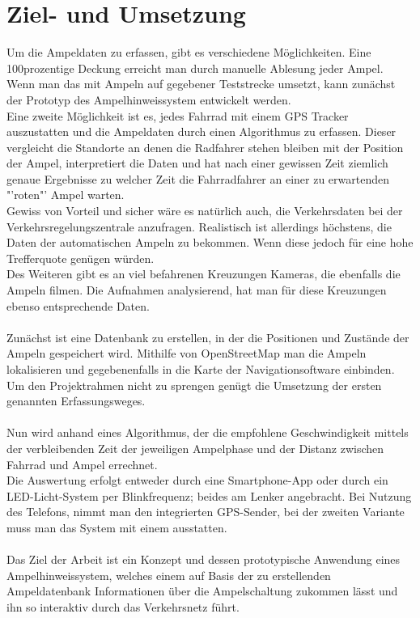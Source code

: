 \section{Ziel- und Umsetzung}
Um die Ampeldaten zu erfassen, gibt es verschiedene Möglichkeiten. Eine 100prozentige Deckung erreicht man durch manuelle Ablesung jeder Ampel. Wenn man das mit Ampeln auf gegebener Teststrecke umsetzt, kann zunächst der Prototyp des Ampelhinweissystem entwickelt werden. \\
Eine zweite Möglichkeit ist es, jedes Fahrrad mit einem \gls{GPS} Tracker auszustatten und die Ampeldaten durch einen Algorithmus zu erfassen. Dieser vergleicht die Standorte an denen die Radfahrer stehen bleiben mit der Position der Ampel, interpretiert die Daten und hat nach einer gewissen Zeit ziemlich genaue Ergebnisse zu welcher Zeit die Fahrradfahrer an einer zu erwartenden "'roten"' Ampel warten.\\
Gewiss von Vorteil und sicher wäre es natürlich auch, die Verkehrsdaten bei der Verkehrsregelungszentrale anzufragen. Realistisch ist allerdings höchstens, die Daten der automatischen Ampeln zu bekommen. Wenn diese jedoch für eine hohe Trefferquote genügen würden.\\
Des Weiteren gibt es an viel befahrenen Kreuzungen Kameras, die ebenfalls die Ampeln filmen. Die Aufnahmen analysierend, hat man für diese Kreuzungen ebenso entsprechende Daten.\\\\
Zunächst ist eine Datenbank zu erstellen, in der die Positionen und Zustände der Ampeln gespeichert wird. Mithilfe von OpenStreetMap man die Ampeln lokalisieren und gegebenenfalls in die Karte der Navigationsoftware einbinden. Um den Projektrahmen nicht zu sprengen genügt die Umsetzung der ersten genannten Erfassungsweges.\\\\
Nun wird anhand eines Algorithmus, der die empfohlene Geschwindigkeit mittels der verbleibenden Zeit der jeweiligen Ampelphase und der Distanz zwischen Fahrrad und Ampel errechnet.\\
Die Auswertung erfolgt entweder durch eine Smartphone-App oder durch ein \gls{LED}-Licht-System per Blinkfrequenz; beides am Lenker angebracht. Bei Nutzung des Telefons, nimmt man den integrierten \gls{GPS}-Sender, bei der zweiten Variante muss man das System mit einem ausstatten.
\\\\
Das Ziel der Arbeit ist ein Konzept und dessen prototypische Anwendung eines Ampelhinweissystem, welches einem auf Basis der zu erstellenden  Ampeldatenbank Informationen über die Ampelschaltung zukommen lässt und ihn so interaktiv durch das Verkehrsnetz führt.
